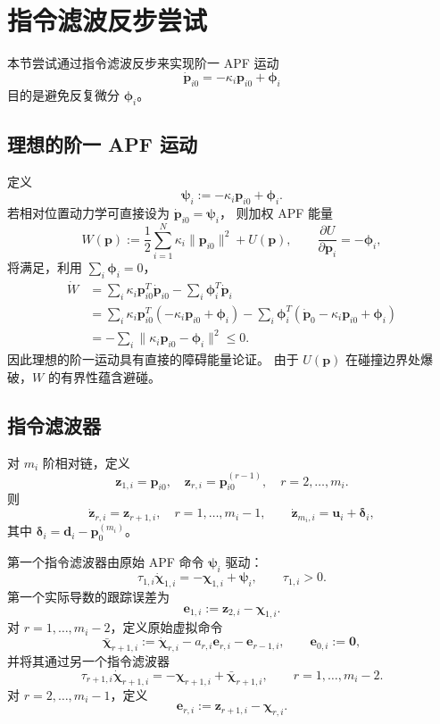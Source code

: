 \section{指令滤波反步尝试}

本节尝试通过指令滤波反步来实现阶一 APF 运动
\[
    \dot{\bm p}_{i0}= -\kappa_i\bm p_{i0}+\bm\phi_i
\]
目的是避免反复微分 $\bm\phi_i$。

\subsection{理想的阶一 APF 运动}

定义
\[
    \bm\psi_i := -\kappa_i\bm p_{i0}+\bm\phi_i .
\]
若相对位置动力学可直接设为 $\dot{\bm p}_{i0}=\bm\psi_i$，
则加权 APF 能量
\[
    W(\bm p)
    :=\frac12\sum_{i=1}^{N}\kappa_i\|\bm p_{i0}\|^2+U(\bm p),
    \qquad
    \frac{\partial U}{\partial \bm p_i}=-\bm\phi_i,
\]
将满足，利用 $\sum_i\bm\phi_i=0$，
\[
\begin{aligned}
    \dot W
    &=\sum_i\kappa_i\bm p_{i0}^{T}\dot{\bm p}_{i0}
      -\sum_i\bm\phi_i^T\dot{\bm p}_i\\
    &=\sum_i\kappa_i\bm p_{i0}^{T}
      (-\kappa_i\bm p_{i0}+\bm\phi_i)
      -\sum_i\bm\phi_i^T
      (\dot{\bm p}_0-\kappa_i\bm p_{i0}+\bm\phi_i)\\
    &=-\sum_i\|\kappa_i\bm p_{i0}-\bm\phi_i\|^2\le0.
\end{aligned}
\]
因此理想的阶一运动具有直接的障碍能量论证。
由于 $U(\bm p)$ 在碰撞边界处爆破，$W$ 的有界性蕴含避碰。

\subsection{指令滤波器}

对 $m_i$ 阶相对链，定义
\[
    \bm z_{1,i}=\bm p_{i0},\quad
    \bm z_{r,i}=\bm p_{i0}^{(r-1)},\quad r=2,\dots,m_i.
\]
则
\[
    \dot{\bm z}_{r,i}=\bm z_{r+1,i},\quad r=1,\dots,m_i-1,
    \qquad
    \dot{\bm z}_{m_i,i}=\bm u_i+\bm\delta_i,
\]
其中 $\bm\delta_i=\bm d_i-\bm p_0^{(m_i)}$。

第一个指令滤波器由原始 APF 命令 $\bm\psi_i$ 驱动：
\[
    \tau_{1,i}\dot{\bm\chi}_{1,i}
    =-\bm\chi_{1,i}+\bm\psi_i,\qquad \tau_{1,i}>0.
\]
第一个实际导数的跟踪误差为
\[
    \bm e_{1,i}:=\bm z_{2,i}-\bm\chi_{1,i}.
\]
对 $r=1,\dots,m_i-2$，定义原始虚拟命令
\[
    \bar{\bm\chi}_{r+1,i}
    :=\dot{\bm\chi}_{r,i}
      -a_{r,i}\bm e_{r,i}
      -\bm e_{r-1,i},
    \qquad \bm e_{0,i}:=\bm 0,
\]
并将其通过另一个指令滤波器
\[
    \tau_{r+1,i}\dot{\bm\chi}_{r+1,i}
    =-\bm\chi_{r+1,i}+\bar{\bm\chi}_{r+1,i},
    \qquad r=1,\dots,m_i-2.
\]
对 $r=2,\dots,m_i-1$，定义
\[
    \bm e_{r,i}:=\bm z_{r+1,i}-\bm\chi_{r,i}.
\]


